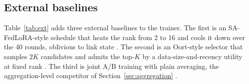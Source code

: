 \documentclass[preprint,12pt]{elsarticle}
\begin{document}
\begin{table}[t]
\centering
\caption{Extended stress matrix. Results use five seeds and report round-40 accuracy as mean over seeds. The mobility-only and $\alpha{=}1.0$ scenarios probe extreme conditions; the last two columns repeat the 0.1\,s deadline on CIFAR-100 and MNIST.}
\label{tab:extended}
\end{table}

\subsection{External baselines}
Table~\ref{tab:ext} adds three external baselines to the trainer. The first is an SA-FedLoRA-style schedule that heats the rank from 2 to 16 and cools it down over the 40 rounds, oblivious to link state \cite{yang2024safedlora}. The second is an Oort-style selector that samples $2K$ candidates and admits the top-$K$ by a data-size-and-recency utility at fixed rank \cite{oort2021oort}. The third is joint A/B training with plain averaging, the aggregation-level competitor of Section~\ref{sec:aggregation} \cite{guo2025fedsalora}.
\end{document}
